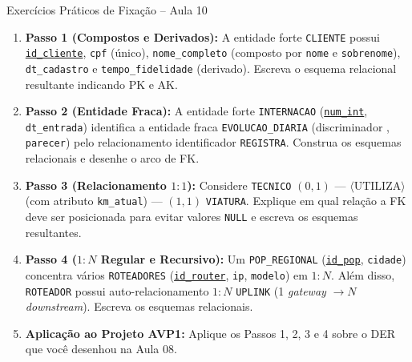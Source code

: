 \begin{frame}{Exercícios Práticos de Fixação -- Aula 10}
  \vspace{-0.18cm}
  \scriptsize
  \begin{enumerate}
    \item \textbf{Passo 1 (Compostos e Derivados):} A entidade forte \texttt{CLIENTE} possui \underline{\texttt{id\_cliente}}, \texttt{cpf} (único), \texttt{nome\_completo} (composto por \texttt{nome} e \texttt{sobrenome}), \texttt{dt\_cadastro} e \texttt{tempo\_fidelidade} (derivado). Escreva o esquema relacional resultante indicando PK e AK.
    \item \textbf{Passo 2 (Entidade Fraca):} A entidade forte \texttt{INTERNACAO} (\underline{\texttt{num\_int}}, \texttt{dt\_entrada}) identifica a entidade fraca \texttt{EVOLUCAO\_DIARIA} (discriminador , \texttt{parecer}) pelo relacionamento identificador \texttt{REGISTRA}. Construa os esquemas relacionais e desenhe o arco de FK.
    \item \textbf{Passo 3 (Relacionamento $1:1$):} Considere \texttt{TECNICO} $(0, 1)$ --- $\langle\text{UTILIZA}\rangle$ (com atributo \texttt{km\_atual}) --- $(1, 1)$ \texttt{VIATURA}. Explique em qual relação a FK deve ser posicionada para evitar valores \texttt{NULL} e escreva os esquemas resultantes.
    \item \textbf{Passo 4 ($1:N$ Regular e Recursivo):} Um \texttt{POP\_REGIONAL} (\underline{\texttt{id\_pop}}, \texttt{cidade}) concentra vários \texttt{ROTEADORES} (\underline{\texttt{id\_router}}, \texttt{ip}, \texttt{modelo}) em $1:N$. Além disso, \texttt{ROTEADOR} possui auto-relacionamento $1:N$ \texttt{UPLINK} (1 \textit{gateway} $\to N$ \textit{downstream}). Escreva os esquemas relacionais.
    \item \textbf{Aplicação ao Projeto AVP1:} Aplique os Passos 1, 2, 3 e 4 sobre o DER que você desenhou na Aula 08.
  \end{enumerate}
\end{frame}
